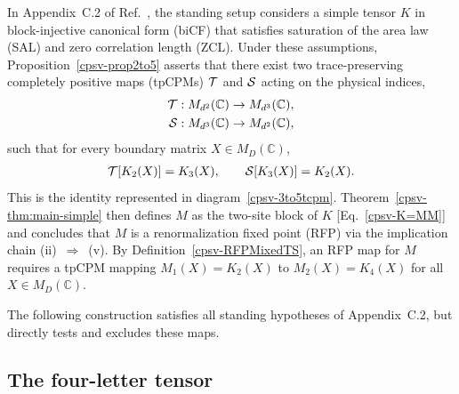 \documentclass[aps,pra,reprint,nofootinbib,onecolumn]{revtex4-2}
\begin{document}
In Appendix~C.2 of Ref.~\cite{Cirac2017MPDO_AnnPhys}, the standing setup
considers a simple tensor $K$ in block-injective canonical form (biCF) that
satisfies saturation of the area law (SAL) and zero correlation length (ZCL).
Under these assumptions, Proposition~\ref{cpsv-prop2to5} asserts that there
exist two trace-preserving completely positive maps (tpCPMs) $\mathcal{T}$ and $\mathcal{S}$
acting on the physical indices,
\begin{align}
	\mathcal{T} & : M_{d^2}(\mathbb C) \to M_{d^3}(\mathbb C), \nonumber \\
	\mathcal{S} & : M_{d^3}(\mathbb C) \to M_{d^2}(\mathbb C),
	\label{eq:TS-domains}
\end{align}
such that for every boundary matrix $X\in M_D(\mathbb C)$,
\begin{align}
	\mathcal{T}[K_2(X)] = K_3(X), \qquad \mathcal{S}[K_3(X)] = K_2(X).
	\label{eq:C15-statement}
\end{align}
This is the identity represented in diagram~\eqref{cpsv-3to5tcpm}.
Theorem~\ref{cpsv-thm:main-simple} then defines $M$ as the two-site block
of $K$ [Eq.~\eqref{cpsv-K=MM}] and concludes that $M$ is a renormalization
fixed point (RFP) via the implication chain (ii)~$\Rightarrow$~(v).
By Definition~\ref{cpsv-RFPMixedTS}, an RFP map for $M$ requires a
tpCPM mapping $M_1(X) = K_2(X)$ to $M_2(X) = K_4(X)$ for all
$X\in M_D(\mathbb C)$.

The following construction satisfies all standing hypotheses of
Appendix~C.2, but directly tests and excludes these maps.

\subsection{The four-letter tensor}
\end{document}
